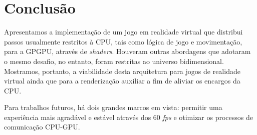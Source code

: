 \documentclass{SBCbookchapter}
\begin{document}
\section{Conclusão}\label{sec:conclusion}
Apresentamos a implementação de um jogo em realidade virtual que distribui passos usualmente restritos à CPU, tais como lógica de jogo e movimentação, para a GPGPU, através de \textit{shaders}. Houveram outras abordagens que adotaram o mesmo desafio, no entanto, foram restritas ao universo bidimensional. Mostramos, portanto, a viabilidade desta arquitetura para jogos de realidade virtual ainda que para a renderização auxiliar a fim de aliviar os encargos da CPU.

Para trabalhos futuros, há dois grandes marcos em vista: permitir uma experiência mais agradável e estável através dos 60 \textit{fps} e otimizar os processos de comunicação CPU-GPU.



\end{document}
